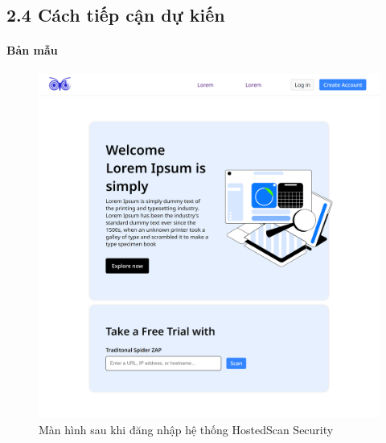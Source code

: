 \subsection*{2.4  Cách tiếp cận dự kiến}
\paragraph{Bản mẫu}
\vspace{1cm}

\begin{figure}[H]
    \centering
    \includegraphics[width=\textwidth]{images/prototype/prototype_22112022/home.png}
    \caption{Màn hình sau khi đăng nhập hệ thống HostedScan Security}
\end{figure}

